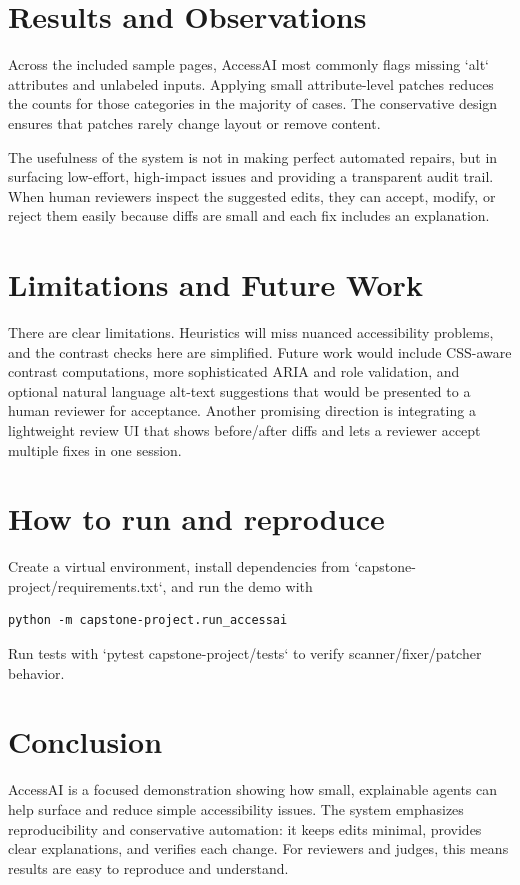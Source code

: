 \documentclass[10pt,twocolumn]{article}
\begin{document}
\section{Results and Observations}
Across the included sample pages, AccessAI most commonly flags missing `alt` attributes and unlabeled inputs. Applying small attribute-level patches reduces the counts for those categories in the majority of cases. The conservative design ensures that patches rarely change layout or remove content.

The usefulness of the system is not in making perfect automated repairs, but in surfacing low-effort, high-impact issues and providing a transparent audit trail. When human reviewers inspect the suggested edits, they can accept, modify, or reject them easily because diffs are small and each fix includes an explanation.

\section{Limitations and Future Work}
There are clear limitations. Heuristics will miss nuanced accessibility problems, and the contrast checks here are simplified. Future work would include CSS-aware contrast computations, more sophisticated ARIA and role validation, and optional natural language alt-text suggestions that would be presented to a human reviewer for acceptance. Another promising direction is integrating a lightweight review UI that shows before/after diffs and lets a reviewer accept multiple fixes in one session.

\section{How to run and reproduce}
Create a virtual environment, install dependencies from `capstone-project/requirements.txt`, and run the demo with

\begin{verbatim}
python -m capstone-project.run_accessai
\end{verbatim}

Run tests with `pytest capstone-project/tests` to verify scanner/fixer/patcher behavior.

\section{Conclusion}
AccessAI is a focused demonstration showing how small, explainable agents can help surface and reduce simple accessibility issues. The system emphasizes reproducibility and conservative automation: it keeps edits minimal, provides clear explanations, and verifies each change. For reviewers and judges, this means results are easy to reproduce and understand.

\vfill
\end{document}
